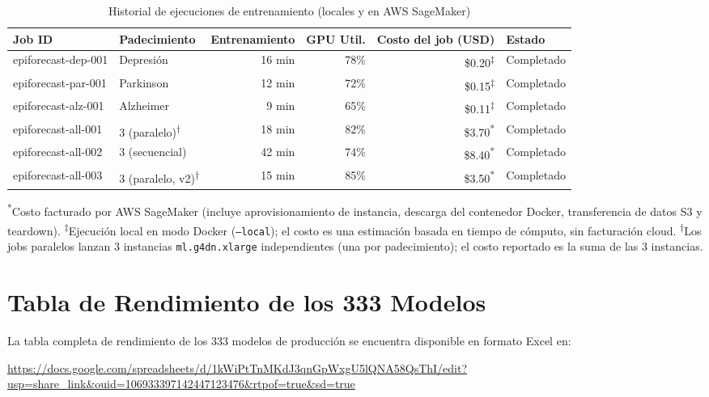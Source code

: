 \documentclass[12pt, letterpaper]{article}
\begin{document}
\begin{table}[H]
\centering
\caption{Historial de ejecuciones de entrenamiento (locales y en AWS SageMaker)}
\label{tab:logs_sagemaker}
\scriptsize
\setlength{\tabcolsep}{3pt}
\begin{tabularx}{\textwidth}{l X r r r l}
\toprule
\textbf{Job ID} & \textbf{Padecimiento} & \textbf{Entrenamiento} & \textbf{GPU Util.} & \textbf{Costo del job (USD)} & \textbf{Estado} \\
\midrule
epiforecast-dep-001 & Depresión & 16 min & 78\% & \$0.20\textsuperscript{$\ddagger$} & Completado \\
epiforecast-par-001 & Parkinson & 12 min & 72\% & \$0.15\textsuperscript{$\ddagger$} & Completado \\
epiforecast-alz-001 & Alzheimer & 9 min & 65\% & \$0.11\textsuperscript{$\ddagger$} & Completado \\
epiforecast-all-001 & 3 (paralelo)\textsuperscript{$\dagger$} & 18 min & 82\% & \$3.70\textsuperscript{*} & Completado \\
epiforecast-all-002 & 3 (secuencial) & 42 min & 74\% & \$8.40\textsuperscript{*} & Completado \\
epiforecast-all-003 & 3 (paralelo, v2)\textsuperscript{$\dagger$} & 15 min & 85\% & \$3.50\textsuperscript{*} & Completado \\
\bottomrule
\end{tabularx}
\vspace{0.3em}
{\scriptsize \textsuperscript{*}Costo facturado por AWS SageMaker (incluye aprovisionamiento de instancia, descarga del contenedor Docker, transferencia de datos S3 y teardown). \textsuperscript{$\ddagger$}Ejecución local en modo Docker (\texttt{--local}); el costo es una estimación basada en tiempo de cómputo, sin facturación cloud. \textsuperscript{$\dagger$}Los jobs paralelos lanzan 3 instancias \texttt{ml.g4dn.xlarge} independientes (una por padecimiento); el costo reportado es la suma de las 3 instancias.}
\end{table}

\section{Tabla de Rendimiento de los 333 Modelos}\label{sec:tabla_333}

La tabla completa de rendimiento de los 333 modelos de producción se encuentra disponible en formato Excel en:

\begin{center}
\url{https://docs.google.com/spreadsheets/d/1kWiPtTnMKdJ3qnGpWxgU5lQNA58QsThI/edit?usp=share_link&ouid=106933397142447123476&rtpof=true&sd=true}
\end{center}
\end{document}
